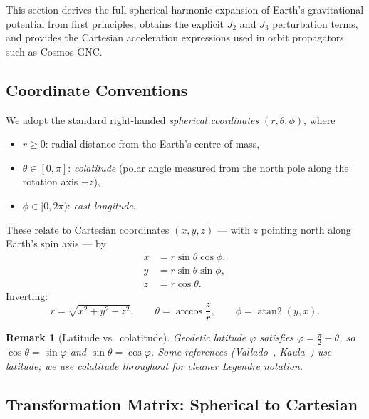 \documentclass[11pt]{article}
\newtheorem{remark}{Remark}
\begin{document}
This section derives the full spherical harmonic expansion of Earth's gravitational
potential from first principles, obtains the explicit $J_2$ and $J_3$ perturbation
terms, and provides the Cartesian acceleration expressions used in orbit propagators
such as Cosmos GNC.

\subsection{Coordinate Conventions}
\label{ssec:coords}

We adopt the standard right-handed \emph{spherical coordinates}
$(r,\theta,\phi)$, where
\begin{itemize}
  \item $r \geq 0$: radial distance from the Earth's centre of mass,
  \item $\theta \in [0,\pi]$: \emph{colatitude} (polar angle measured from
        the north pole along the rotation axis $+z$),
  \item $\phi \in [0, 2\pi)$: \emph{east longitude}.
\end{itemize}
These relate to Cartesian coordinates $(x,y,z)$ --- with $z$ pointing north
along Earth's spin axis --- by
\begin{align}
  x &= r\sin\theta\cos\phi, \label{eq:sph2cart-x}\\
  y &= r\sin\theta\sin\phi, \label{eq:sph2cart-y}\\
  z &= r\cos\theta.         \label{eq:sph2cart-z}
\end{align}
Inverting:
\begin{equation}
  r = \sqrt{x^2+y^2+z^2},\qquad
  \theta = \arccos\!\frac{z}{r},\qquad
  \phi = \mathop{\mathrm{atan2}}(y,x).
  \label{eq:cart2sph}
\end{equation}

\begin{remark}[Latitude vs.\ colatitude]
  Geodetic \emph{latitude} $\varphi$ satisfies $\varphi = \tfrac{\pi}{2}-\theta$,
  so $\cos\theta = \sin\varphi$ and $\sin\theta = \cos\varphi$.  Some references
  (Vallado~\cite{Vallado2013}, Kaula~\cite{Kaula1966}) use latitude; we use
  colatitude throughout for cleaner Legendre notation.
\end{remark}

\subsection{Transformation Matrix: Spherical to Cartesian}
\label{ssec:transform}
\end{document}
